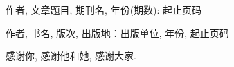 

\reseachresult

{
\begin{enumerate}[{[1]}]
\item   作者, 文章题目, 期刊名, 年份(期数): 起止页码
\item   作者, 书名, 版次, 出版地：出版单位, 年份, 起止页码
\end{enumerate}
}












\acknowledgement



感谢你, 感谢他和她, 感谢大家.














  \iflib
  \else
  \newpage
  \cleardoublepage
  \fi

